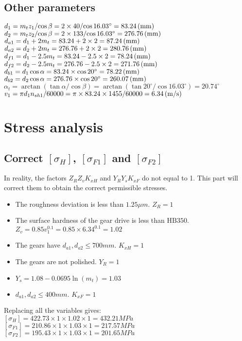 \subsection{Other parameters}
$ d_1 = {m_tz_1}/{\cos\beta} = {2\times 40}/{\cos16.03^\circ} = 83.24\, (\mathrm{mm}) $\\
$ d_2 = {m_tz_2}/{\cos\beta} = {2\times 133}/{\cos16.03^\circ} = 276.76\, (\mathrm{mm}) $\\
$ d_{a1} = d_1 + 2m_t = 83.24 + 2\times 2 = 87.24\, (\mathrm{mm})$\\
$ d_{a2} = d_2 + 2m_t = 276.76 + 2\times 2 = 280.76\, (\mathrm{mm})$\\
$ d_{f1} = d_1 - 2.5m_t = 83.24 - 2.5\times 2 = 78.24\, (\mathrm{mm})$\\
$ d_{f2} = d_2 - 2.5m_t = 276.76 - 2.5\times 2 = 271.76\, (\mathrm{mm})$\\
$ d_{b1} = d_1\cos\alpha = 83.24\times \cos 20^\circ = 78.22\, (\mathrm{mm})$\\
$ d_{b2} = d_2\cos\alpha = 276.76\times \cos 20^\circ = 260.07 \, (\mathrm{mm})$\\
$ \alpha_t = \arctan\left({\tan\alpha}/{\cos\beta}\right) = \arctan\left({\tan 20^\circ}/{\cos 16.03^\circ}\right) = 20.74^\circ $\\
$ v_1 = {\pi d_1n_{sh1}}/{60000} = {\pi \times 83.24 \times 1455}/{60000} = 6.34\, (\mathrm{m/s})$

\section{Stress analysis}
\subsection{Correct $ [\sigma_H] $, $ [\sigma_{F1}] $ and $ [\sigma_{F2}] $}
In reality, the factors $ Z_RZ_vK_{xH} $ and $ Y_RY_sK_{xF} $ do not equal to 1. This part will correct them to obtain the correct permissible stresses.

\begin{itemize}
	\item The roughness deviation is less than $ 1.25\mu m $. $ Z_R = 1 $
	\item The surface hardness of the gear drive is less than $ \text{HB}350 $. $ Z_v = 0.85v_1^{0.1} = 0.85\times 6.34^{0.1} = 1.02$
	\item The gears have $ d_{a1}, d_{a2} \leq 700\unit{mm} $. $ K_{xH} = 1$
	\item The gears are not polished. $ Y_R=1 $
	\item $ Y_s = 1.08-0.0695\ln(m_t) = 1.03 $
	\item $ d_{a1}, d_{a2} \leq 400 \unit{mm} $. $ K_{xF}=1 $
\end{itemize}
Replacing all the variables gives:\\
$ [\sigma_H] = 422.73\times 1\times 1.02\times 1 = 432.21\unit{MPa}$ \\
$ [\sigma_{F1}] = 210.86\times 1\times 1.03\times 1 = 217.57\unit{MPa}$\\
$ [\sigma_{F2}] = 195.43\times 1\times 1.03\times 1 = 201.65\unit{MPa}$

